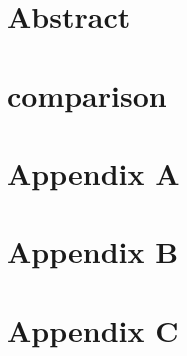 




\maketitle
\vfill
\section{Abstract}
\newpage
\tableofcontents
\newpage


\newpage

\newpage


\newpage

\newpage

\newpage
\section{comparison}
\newpage
\section{Appendix A}
\newpage
\section{Appendix B}
\newpage
\section{Appendix C}
\newpage


